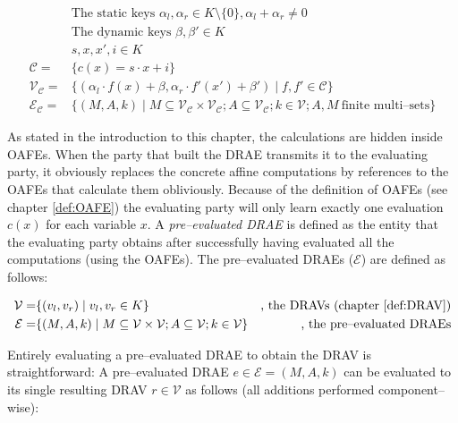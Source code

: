 \begin{align}
%
  &\text{The static keys } \alpha_l, \alpha_r \in K \setminus \{0\}, \alpha_l +
  \alpha_r \neq 0\nonumber\\
%
  &\text{The dynamic keys } \beta, \beta' \in K \nonumber\\
%
  &s, x, x', i \in K \nonumber\\
%
  \mathcal{C} = & \{ c(x) = s \cdot x + i \} \nonumber\\
%
  \mathcal{V}_\mathcal{C} = & \{ (\alpha_l \cdot f(x) + \beta,
                      \alpha_r \cdot f'(x') + \beta' )
                    \mid f, f' \in \mathcal{C} \} \nonumber\\
%
  \label{rel:DRAE}
  \mathcal{E}_\mathcal{C} = & \{ (M, A, k) \mid
      M \subseteq \mathcal{V}_\mathcal{C} \times
      \mathcal{V}_\mathcal{C}; A \subseteq \mathcal{V}_\mathcal{C};
      k \in \mathcal{V};
      A, M~\text{finite multi--sets} \}
%
\end{align}

As stated in the introduction to this chapter, the calculations are hidden
inside OAFEs. When the party that built the DRAE transmits it to the evaluating
party, it obviously replaces the concrete affine computations by references to
the OAFEs that calculate them obliviously.  Because of the definition of OAFEs
(see chapter \ref{def:OAFE}) the evaluating party will only learn exactly one
evaluation $c(x)$ for each variable $x$. A \emph{pre--evaluated DRAE} is defined
as the entity that the evaluating party obtains after successfully having
evaluated all the computations (using the OAFEs). The pre--evaluated DRAEs
($\mathcal{E}$) are defined as follows:

\begin{align}
  \mathcal{V} = & \{ (v_l, v_r) \mid v_l, v_r \in K \}
  &\text{, the DRAVs (chapter \ref{def:DRAV})} \nonumber\\
%
  \label{rel:pre-eval-DRAE}
  \mathcal{E} = & \{ (M, A, k) \mid
      M \subseteq \mathcal{V} \times \mathcal{V};
      A \subseteq \mathcal{V};
      k \in \mathcal{V} \}
      &\text{, the pre--evaluated DRAEs}
\end{align}


\label{sec:DRAE-decoding}

Entirely evaluating a pre--evaluated DRAE to obtain the DRAV is straightforward:
A pre--evaluated DRAE $e \in \mathcal{E} = (M,A, k)$ can be evaluated to its
single resulting DRAV $r \in \mathcal{V}$ as follows (all additions performed
component--wise):

